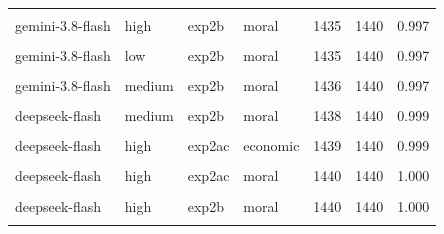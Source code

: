 \documentclass[
]{article}
\begin{document}
\begin{table}[!h]
{\begin{tabular}[t]{llllrrr}
\cellcolor{gray!10}{gemini-3.8-flash} & \cellcolor{gray!10}{high} & \cellcolor{gray!10}{exp2ac} & \cellcolor{gray!10}{moral} & \cellcolor{gray!10}{1435} & \cellcolor{gray!10}{1440} & \cellcolor{gray!10}{0.997}\\
gemini-3.8-flash & high & exp2b & moral & 1435 & 1440 & 0.997\\
\cellcolor{gray!10}{gemini-3.8-flash} & \cellcolor{gray!10}{low} & \cellcolor{gray!10}{exp2ac} & \cellcolor{gray!10}{economic} & \cellcolor{gray!10}{1435} & \cellcolor{gray!10}{1440} & \cellcolor{gray!10}{0.997}\\
\addlinespace
gemini-3.8-flash & low & exp2b & moral & 1435 & 1440 & 0.997\\
\cellcolor{gray!10}{gemini-3.8-flash} & \cellcolor{gray!10}{medium} & \cellcolor{gray!10}{exp2b} & \cellcolor{gray!10}{economic} & \cellcolor{gray!10}{1436} & \cellcolor{gray!10}{1440} & \cellcolor{gray!10}{0.997}\\
gemini-3.8-flash & medium & exp2b & moral & 1436 & 1440 & 0.997\\
\cellcolor{gray!10}{claude-sonnet-5-5} & \cellcolor{gray!10}{low} & \cellcolor{gray!10}{exp2b} & \cellcolor{gray!10}{economic} & \cellcolor{gray!10}{1438} & \cellcolor{gray!10}{1440} & \cellcolor{gray!10}{0.999}\\
deepseek-flash & medium & exp2b & moral & 1438 & 1440 & 0.999\\
\addlinespace
\cellcolor{gray!10}{claude-sonnet-5-5} & \cellcolor{gray!10}{high} & \cellcolor{gray!10}{exp2b} & \cellcolor{gray!10}{moral} & \cellcolor{gray!10}{1439} & \cellcolor{gray!10}{1440} & \cellcolor{gray!10}{0.999}\\
deepseek-flash & high & exp2ac & economic & 1439 & 1440 & 0.999\\
\cellcolor{gray!10}{deepseek-flash} & \cellcolor{gray!10}{medium} & \cellcolor{gray!10}{exp2b} & \cellcolor{gray!10}{economic} & \cellcolor{gray!10}{1439} & \cellcolor{gray!10}{1440} & \cellcolor{gray!10}{0.999}\\
deepseek-flash & high & exp2ac & moral & 1440 & 1440 & 1.000\\
\cellcolor{gray!10}{deepseek-flash} & \cellcolor{gray!10}{high} & \cellcolor{gray!10}{exp2b} & \cellcolor{gray!10}{economic} & \cellcolor{gray!10}{1440} & \cellcolor{gray!10}{1440} & \cellcolor{gray!10}{1.000}\\
\addlinespace
deepseek-flash & high & exp2b & moral & 1440 & 1440 & 1.000\\
\cellcolor{gray!10}{deepseek-flash} & \cellcolor{gray!10}{medium} & \cellcolor{gray!10}{exp2ac} & \cellcolor{gray!10}{economic} & \cellcolor{gray!10}{1440} & \cellcolor{gray!10}{1440} & \cellcolor{gray!10}{1.000}\\

\end{tabular}}
\end{table}
\end{document}
